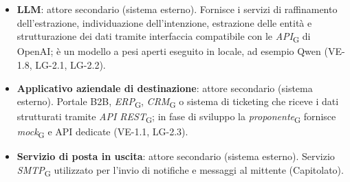 \begin{itemize}
    \item \textbf{LLM}: attore secondario (sistema esterno). Fornisce i servizi di raffinamento dell'estrazione, individuazione dell'intenzione, estrazione delle entità e strutturazione dei dati tramite interfaccia compatibile con le \textit{API}\textsubscript{G} di OpenAI; è un modello a pesi aperti eseguito in locale, ad esempio Qwen (VE-1.8, LG-2.1, LG-2.2).
    \item \textbf{Applicativo aziendale di destinazione}: attore secondario (sistema esterno). Portale B2B, \textit{ERP}\textsubscript{G}, \textit{CRM}\textsubscript{G} o sistema di ticketing che riceve i dati strutturati tramite \textit{API REST}\textsubscript{G}; in fase di sviluppo la \textit{proponente}\textsubscript{G} fornisce \textit{mock}\textsubscript{G} e API dedicate (VE-1.1, LG-2.3).
    \item \textbf{Servizio di posta in uscita}: attore secondario (sistema esterno). Servizio \textit{SMTP}\textsubscript{G} utilizzato per l'invio di notifiche e messaggi al mittente (Capitolato).
\end{itemize}